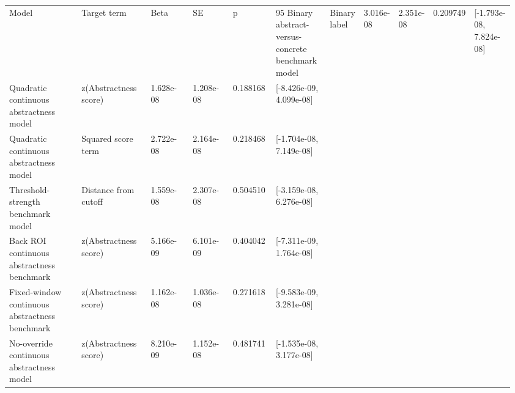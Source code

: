 \begin{tabular}{p{0.28\linewidth}p{0.18\linewidth}p{0.14\linewidth}p{0.12\linewidth}p{0.10\linewidth}p{0.14\linewidth}}
\toprule
Model & Target term & Beta & SE & p & 95%
\midrule
Binary abstract-versus-concrete benchmark model & Binary label & 3.016e-08 & 2.351e-08 & 0.209749 & [-1.793e-08, 7.824e-08]\\
Quadratic continuous abstractness model & z(Abstractness score) & 1.628e-08 & 1.208e-08 & 0.188168 & [-8.426e-09, 4.099e-08]\\
Quadratic continuous abstractness model & Squared score term & 2.722e-08 & 2.164e-08 & 0.218468 & [-1.704e-08, 7.149e-08]\\
Threshold-strength benchmark model & Distance from cutoff & 1.559e-08 & 2.307e-08 & 0.504510 & [-3.159e-08, 6.276e-08]\\
Back ROI continuous abstractness benchmark & z(Abstractness score) & 5.166e-09 & 6.101e-09 & 0.404042 & [-7.311e-09, 1.764e-08]\\
Fixed-window continuous abstractness benchmark & z(Abstractness score) & 1.162e-08 & 1.036e-08 & 0.271618 & [-9.583e-09, 3.281e-08]\\
No-override continuous abstractness model & z(Abstractness score) & 8.210e-09 & 1.152e-08 & 0.481741 & [-1.535e-08, 3.177e-08]\\
\bottomrule
\end{tabular}
